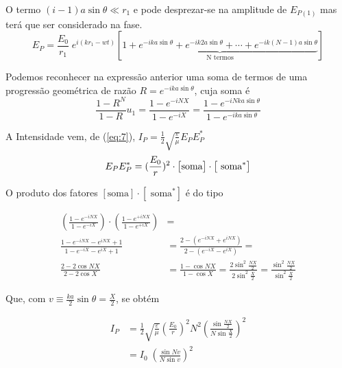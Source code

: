 \documentclass[a4paper,12pt]{article}
\begin{document}
O termo $(i-1) a \sin \theta \ll r_1$ e pode desprezar-se na amplitude de $E_{P(1)}$ mas terá que ser considerado na fase.
\begin{equation}
	\label{eq:39} E_P = \frac{E_0}{r_1} \; e^{i(k r_1 -wt)} \left[ \underbrace{1 + e^{-i k a \sin \theta} + e^{-i k 2 a \sin \theta} + \cdots + e^{-i k (N-1) a \sin \theta}}_{\text{N termos} }\right]
\end{equation}

Podemos reconhecer na expressão anterior uma soma de termos de uma progressão geométrica de razão $R = e^{-i k a \sin \theta}$, cuja soma 
é 
\begin{equation}
	\frac{1-R^N}{1-R} u_1  = \frac{1-e^{-i N X}}{1-e^{-i X}} = \frac{1-e^{-i N k a \sin \theta}}{1-e^{-i k a \sin \theta}} \label{eq:40}
\end{equation}


A Intensidade vem, de (\ref{eq:7}),  $I_P  =\frac{1}{2} \sqrt{\frac{ \varepsilon}{\mu}} E_P E_P^*$ 
\begin{equation}
	E_P E_P^* = (\frac{E_0}{r})^2 \cdot  \big[\text{soma} \big] \cdot \big[\text{ soma}^* \big] \label{eq:41}\\
\end{equation}

O produto dos fatores $ [\text{soma} ] \cdot [\text{ soma}^* ]$ é do tipo 

\begin{align}
\label{eq:42} 
 \left( \frac{1-e^{-i N X}}{1-e^{-i X}} \right) \cdot \left( \frac{1-e^{+i N X}}{1-e^{+i X}}  \right)  &= \nonumber\\
%
%
	 \frac{1-e^{-i N X}-e^{i N X}+1}{1-e^{-i X} -e^{i X} +1} &= \frac{2-(e^{-i N X}+e^{i N X})}{2-(e^{-i X} -e^{i X})} = \nonumber \\
	\frac{2- 2 \cos NX }{2- 2 \cos X} &= \frac{1- \cos NX }{1- \cos X} = \frac{2\sin^2 \frac{NX }{2} }{2\sin^2 \frac{X }{2}} = \frac{\sin^2 \frac{NX }{2} }{\sin^2 \frac{X }{2}} 
\end{align}


Que, com $v \equiv \frac{k a }{2} \sin \theta = \frac{X}{2}$, se obtém  %

\begin{align}
	I_P &= \frac{1}{2} \sqrt{\frac{ \varepsilon}{\mu}} ( \frac{E_0}{r})^2 N^2 \left( \frac{\sin\frac{NX }{2} }{N \sin \frac{X }{2}} \right)^2 \nonumber \\
	&= I_0 \; \left( \frac{\sin N v }{N \sin v} \right)^2 \label{eq:45}
\end{align}
\end{document}

